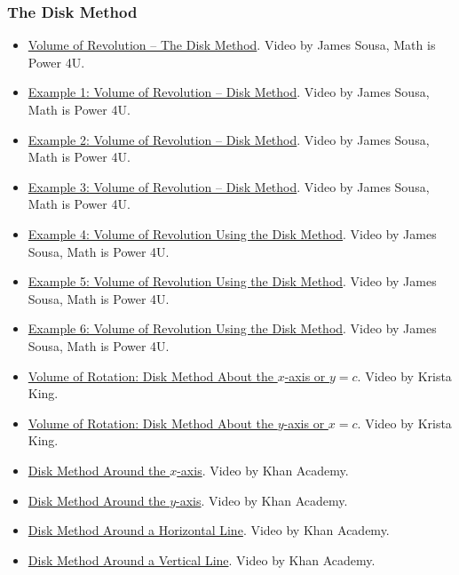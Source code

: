 \subsubsection{The Disk Method}
\label{sss:thed-913f}

\begin{itemize}

\item \href{https://www.youtube.com/watch?v=1CbZlM09zF8}{Volume of Revolution – The Disk Method}.  
Video by James Sousa, Math is Power 4U.

\item \href{https://www.youtube.com/watch?v=oYe4gkKQDE8}{Example 1: Volume of Revolution – Disk Method}.  
Video by James Sousa, Math is Power 4U.

\item \href{https://www.youtube.com/watch?v=e7qNtcWpg2s}{Example 2: Volume of Revolution – Disk Method}.  
Video by James Sousa, Math is Power 4U.

\item \href{https://www.youtube.com/watch?v=Ba_q-eu8n34}{Example 3: Volume of Revolution – Disk Method}.  
Video by James Sousa, Math is Power 4U.

\item \href{https://www.youtube.com/watch?v=yTElv1k33rk}{Example 4: Volume of Revolution Using the Disk Method}.  
Video by James Sousa, Math is Power 4U.

\item \href{https://www.youtube.com/watch?v=xoi-6CyL6cg}{Example 5: Volume of Revolution Using the Disk Method}.  
Video by James Sousa, Math is Power 4U.

\item \href{https://www.youtube.com/watch?v=2tpyuR-GypA}{Example 6: Volume of Revolution Using the Disk Method}.  
Video by James Sousa, Math is Power 4U.

\item \href{https://www.youtube.com/watch?v=RPpih8rD-5k}{Volume of Rotation: Disk Method About the $x$-axis or $y=c$}.  
Video by Krista King.

\item \href{https://www.youtube.com/watch?v=DNmHo68wYFY}{Volume of Rotation: Disk Method About the $y$-axis or $x=c$}.  
Video by Krista King.

\item \href{https://www.youtube.com/watch?v=btGaOTXxXs8}{Disk Method Around the $x$-axis}.  
Video by Khan Academy.

\item \href{https://www.youtube.com/watch?v=43AS7bPUORc}{Disk Method Around the $y$-axis}.  
Video by Khan Academy.

\item \href{https://www.youtube.com/watch?v=XdzcU5JbVcA}{Disk Method Around a Horizontal Line}.  
Video by Khan Academy.

\item \href{https://www.youtube.com/watch?v=jxf7XqvZWWg}{Disk Method Around a Vertical Line}.  
Video by Khan Academy.

\end{itemize}

